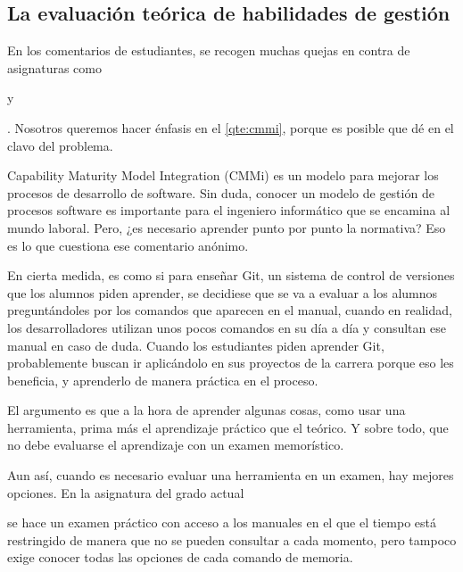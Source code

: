 

\subsection{La evaluación teórica de habilidades de gestión}


En los comentarios de estudiantes,
se recogen muchas quejas en contra de asignaturas como
\subject{Gestión de Proyectos de Desarrollo Software (GPDS)} y
\subject{Procesos de Desarrollo de Software (PDS)}.
Nosotros queremos hacer énfasis en el \cref{qte:cmmi},
porque es posible que dé en el clavo del problema.

Capability Maturity Model Integration (CMMi) es un modelo para mejorar
los procesos de desarrollo de software.
Sin duda, conocer un modelo de gestión de procesos software
es importante para el ingeniero informático que se encamina al mundo laboral.
Pero, ¿es necesario aprender punto por punto la normativa?
Eso es lo que cuestiona ese comentario anónimo.

En cierta medida, es como si para enseñar Git,
un sistema de control de versiones que los alumnos piden aprender,
se decidiese que se va a evaluar a los alumnos preguntándoles
por los comandos que aparecen en el manual,
cuando en realidad, los desarrolladores utilizan
unos pocos comandos en su día a día y
consultan ese manual en caso de duda.
Cuando los estudiantes piden aprender Git,
probablemente buscan ir aplicándolo en sus proyectos de la carrera
porque eso les beneficia,
y aprenderlo de manera práctica en el proceso.

El argumento es que a la hora de aprender algunas cosas,
como usar una herramienta,
prima más el aprendizaje práctico que el teórico.
Y sobre todo, que no debe evaluarse el aprendizaje con un examen memorístico.

Aun así, cuando es necesario evaluar una herramienta en un examen,
hay mejores opciones.
En la asignatura del grado actual
\subject{Introducción a los Sistemas Operativos}
se hace un examen práctico con acceso a los manuales
en el que el tiempo está restringido de manera que
no se pueden consultar a cada momento,
pero tampoco exige conocer todas las opciones de cada comando de memoria.

